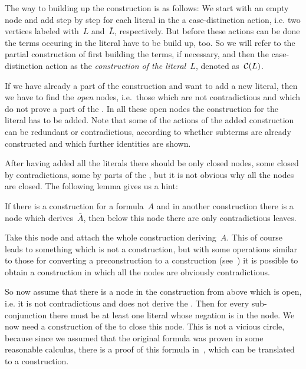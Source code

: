 The way to building up the construction is as follows:
We start with an empty node and add step by step for each literal in the \hd a
case-distinction action, i.e. two vertices labeled with~$L$ and~$\bar L$,
respectively. But before these actions can be done the terms occuring in the
literal have to be build up, too. So we will refer to the partial construction
of first building the terms, if necessary, and then the case-distinction
action as the \emph{construction of the literal~$L$}, denoted as~$\cC(L)$.

If we have already a part of the construction and want to add a new literal,
then we have to find the \emph{open} nodes, i.e.\ those which are not
contradictious and 
which do not prove a part of the \hd. In all these open nodes the construction
for the literal has to be added. Note that some of the actions of the added
construction can be redundant or contradictious, according to whether subterms
are already constructed and which further identities are shown. 

After having added all the literals there should be only closed nodes, some
closed by contradictions, some by parts of the \hd, but it is not obvious why
all the nodes are closed. The following lemma gives us a hint:

\begin{lemma}\label{lemma:1}
If there is a construction for a formula~$A$ and in another construction there
is a node which derives~$\bar A$, then below this node there are only
contradictious leaves.
\end{lemma}

\beginproof Take this node and attach the whole construction
deriving~$A$. This of course leads to something which is not a construction,
but with some operations similar to those for converting a preconstruction to
a construction (see~\cite{Prei96MT}) it is possible to obtain a construction
in which all the nodes are obviously contradictious. \endproof

So now assume that there is a node in the construction from above which is
open, i.e. it is not contradictious and does not derive the \hd. Then for
every sub-conjunction there must be at least one literal whose
negation is in the  
node. We now need a construction of the \hd to close this node. This is not a
vicious circle, because since we assumed that the original formula was proven
in some reasonable calculus, there is a proof of this formula in~\pelk,
which can be translated to a construction.

